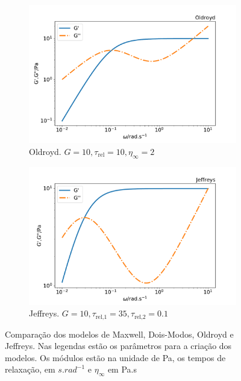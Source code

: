 \begin{figure}[H]
				\begin{subfigure}[t]{.5\textwidth}
					\centering
					\includegraphics[width=\textwidth]{./imagens/reologia/modelos_comparativo_oldroyd}
					\caption{Oldroyd. \(G=10, \tau_{\textrm{rel}}=10, \eta_{\infty}=2\)}
					\label{fig:comparativo_modelo_oldroyd}
				\end{subfigure}%
				\begin{subfigure}[t]{.5\textwidth}
					\centering
					\includegraphics[width=\textwidth]{./imagens/reologia/modelos_comparativo_jeffreys}
					\caption{Jeffreys. \(G=10, \tau_{\textrm{rel,1}}=35, \tau_{\textrm{rel,2}}=0.1 \)}
					\label{fig:comparativo_modelo_jeffreys}
				\end{subfigure}
			
				\caption{Comparação dos modelos de Maxwell, Dois-Modos, Oldroyd e Jeffreys. Nas legendas estão os parâmetros para a criação dos modelos. Os módulos estão na unidade de Pa, os tempos de relaxação, em \(s.rad^{-1}\) e \(\eta_{\infty}\) em Pa.s}
				\label{fig:comparativo_modelos}
			\end{figure}
			
